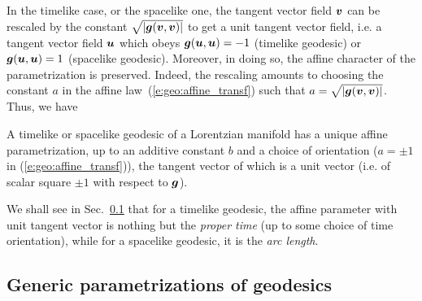 In the timelike case, or the spacelike one,
the tangent vector field $\bm{v}$ can be rescaled by the constant $\sqrt{|\bm{g}(\bm{v},\bm{v})|}$ to get
a unit tangent vector field, i.e. a tangent vector field $\bm{u}$ which obeys
$\bm{g}(\bm{u},\bm{u}) = -1$ (timelike geodesic) or $\bm{g}(\bm{u},\bm{u}) = 1$
(spacelike geodesic). Moreover, in doing so, the affine character of the
parametrization is preserved. Indeed, the rescaling amounts to choosing the constant $a$
in the affine law~(\ref{e:geo:affine_transf}) such that $a = \sqrt{|\bm{g}(\bm{v},\bm{v})|}$.
Thus, we have
\begin{greybox}
A timelike or spacelike geodesic of a Lorentzian manifold has a unique affine parametrization,
up to an additive constant $b$ and a choice of orientation ($a=\pm 1$ in (\ref{e:geo:affine_transf})),
the tangent vector of which is a unit vector (i.e. of scalar square $\pm 1$ with respect to
$\bm{g}$).
\end{greybox}
We shall see in Sec.~\ref{s:geo:gener_param} that for a timelike geodesic,
the affine parameter with unit tangent vector is nothing but the
\emph{proper time} (up to some choice of
time orientation), while for a spacelike
geodesic, it is the \emph{arc length}.

\subsection{Generic parametrizations of geodesics} \label{s:geo:gener_param}

